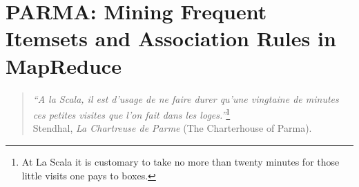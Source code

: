 \chapter[PARMA: Mining Frequent Itemsets and Association Rules in MapReduce]{PARMA:
Mining Frequent Itemsets and Association Rules in
MapReduce\protect{}}\label{ch:parma}

\begin{quote}
  \begin{flushright}
    {\em ``A la Scala, il est d'usage de ne faire durer qu'une vingtaine de
    minutes ces petites visites que l'on fait dans les loges.''}\footnote{At La
    Scala it is customary to take no more than twenty minutes for those little
    visits one pays to boxes.}\\Stendhal, {\em La Chartreuse de Parme} (The
    Charterhouse of Parma).
  \end{flushright}
\end{quote}









